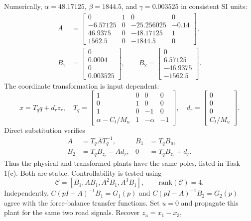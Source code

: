 Numerically, $\alpha=48.17125$, $\beta=1844.5$, and $\gamma=0.003525$ in consistent SI units:
\begin{align}
 A&=\begin{bmatrix}0&1&0&0\\-6.57125&0&-25.256025&-0.14\\
 46.9375&0&-48.17125&1\\1562.5&0&-1844.5&0\end{bmatrix},\\
 B_1&=\begin{bmatrix}0\\0.0004\\0\\0.003525\end{bmatrix},\qquad
 B_2=\begin{bmatrix}0\\6.57125\\-46.9375\\-1562.5\end{bmatrix}.
\end{align}
The coordinate transformation is input dependent:
\begin{equation}
 x=T_q q+d_rz_r,\quad
 T_q=\begin{bmatrix}1&0&0&0\\0&1&0&0\\1&0&-1&0\\
 \alpha-C_t/M_u&1&-\alpha&-1\end{bmatrix},\quad
 d_r=\begin{bmatrix}0\\0\\0\\C_t/M_u\end{bmatrix}.
\end{equation}
Direct substitution verifies
\begin{align}
 A&=T_q\bar A T_q^{-1},&B_1&=T_qB_u,\\
 B_2&=T_qB_{z_r}-Ad_r,&0&=T_qB_{\dot z_r}+d_r.
\end{align}
Thus the physical and transformed plants have the same poles, listed in Task 1(c).
Both are stable. Controllability is tested using
\begin{equation}
 \mathcal C=[B_1,AB_1,A^2B_1,A^3B_1],\qquad \mathrm{rank}(\mathcal C)=4.
\end{equation}
Independently, $C(pI-A)^{-1}B_1=G_1(p)$ and $C(pI-A)^{-1}B_2=G_2(p)$
agree with the force-balance transfer functions.
Set $u=0$ and propagate this plant for the same two road signals. Recover $z_u=x_1-x_3$,
